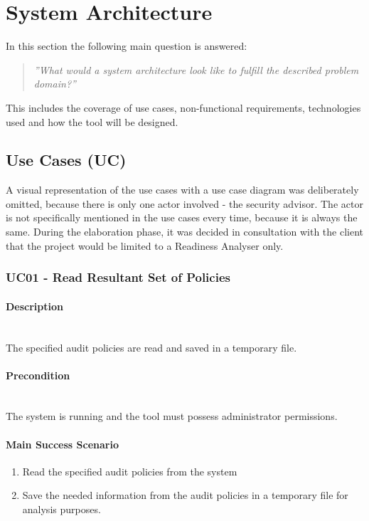 \section{System Architecture}
In this section the following main question is answered: 
\begin{quotation}
    \textit{''What would a system architecture look like to fulfill the described problem domain?''}
\end{quotation}
This includes the coverage of use cases, non-functional requirements, technologies used and how the tool will be designed. 

\subsection{Use Cases (UC)}
A visual representation of the use cases with a use case diagram was deliberately omitted, because there is only one actor involved - the security advisor. The actor is not specifically mentioned in the use cases every time, because it is always the same. During the elaboration phase, it was decided in consultation with the client that the project would be limited to a Readiness Analyser only.

\subsubsection{UC01 - Read Resultant Set of Policies}\label{UC01}
\begin{tcolorbox}
    \paragraph{Description} \ \\
    The specified audit policies are read and saved in a temporary file.
    \ \\
    \paragraph{Precondition} \ \\
    The system is running and the tool must possess administrator permissions.
    \ \\
    \paragraph{Main Success Scenario} 
    \begin{enumerate}
        \item Read the specified audit policies from the system
        \item Save the needed information from the audit policies in a temporary file for analysis purposes.
    \end{enumerate}   
\end{tcolorbox}

